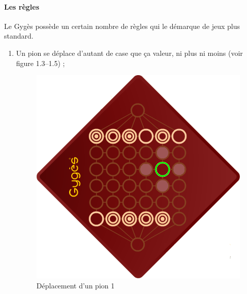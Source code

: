 	\paragraph{Les règles} Le Gygès possède un certain nombre de règles qui le démarque de jeux plus
	\og{}standard\fg{}.
		\begin{enumerate}
			\item Un pion se déplace d'autant de case que ça valeur, ni plus ni moins
			(voir figure 1.3--1.5) ;

			\begin{figure}[h!]
				\centering
				\begin{minipage}[h]{0.25\linewidth}
				\centering
				\includegraphics[width=\textwidth]{images/move1.png}
				\caption{Déplacement d'un pion 1}
				\label{fig:figure1}
				\end{minipage}
				\hspace{0.5cm}
				\begin{minipage}[h]{0.25\linewidth}
				\centering

\end{minipage}
\end{figure}
\end{enumerate}
